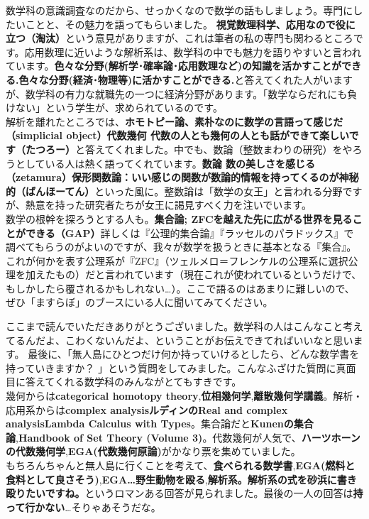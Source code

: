 数学科の意識調査なのだから、せっかくなので数学の話もしましょう。専門にしたいことと、その魅力を語ってもらいました。
{\bf 視覚数理科学、応用なので役に立つ（淘汰）}という意見がありますが、これは筆者の私の専門も関わるところです。応用数理に近いような解析系は、数学科の中でも魅力を語りやすいと言われています。{\bf 色々な分野(解析学･確率論･応用数理など)の知識を活かすことができる.色々な分野(経済･物理等)に活かすことができる.}と答えてくれた人がいますが、数学科の有力な就職先の一つに経済分野があります。「数学ならだれにも負けない」という学生が、求められているのです。\\
解析を離れたところでは、{\bf ホモトピー論、素朴なのに数学の言語って感じだ（simplicial object）}{\bf 代数幾何 代数の人とも幾何の人とも話ができて楽しいです（たつろー）}と答えてくれました。中でも、数論（整数まわりの研究）をやろうとしている人は熱く語ってくれています。{\bf 数論 数の美しさを感じる（zetamura）}{\bf 保形関数論：いい感じの関数が数論的情報を持ってくるのが神秘的（ばんほーてん）}といった風に。整数論は「数学の女王」と言われる分野ですが、熱意を持った研究者たちが女王に謁見すべく力を注いでいます。\\
数学の根幹を探ろうとする人も。{\bf 集合論; ZFCを越えた先に広がる世界を見ることができる（GAP）}詳しくは『公理的集合論』『ラッセルのパラドックス』で調べてもらうのがよいのですが、我々が数学を扱うときに基本となる『集合』。これが何かを表す公理系が『ZFC』（ツェルメロ＝フレンケルの公理系に選択公理を加えたもの）だと言われています（現在これが使われているというだけで、もしかしたら覆されるかもしれない…）。ここで語るのはあまりに難しいので、ぜひ「ますらぼ」のブースにいる人に聞いてみてください。

ここまで読んでいただきありがとうございました。数学科の人はこんなこと考えてるんだよ、こわくないんだよ、ということがお伝えできてればいいなと思います。
最後に、「無人島にひとつだけ何か持っていけるとしたら、どんな数学書を持っていきますか？ 」という質問をしてみました。こんなふざけた質問に真面目に答えてくれる数学科のみんながとてもすきです。\\
幾何からは{\bf categorical homotopy theory},{\bf 位相幾何学},{\bf 離散幾何学講義}。解析・応用系からは{\bf complex analysis}{\bf ルディンのReal and complex analysis}{\bf Lambda Calculus with Types}。集合論だと{\bf Kunenの集合論},{\bf Handbook of Set Theory (Volume 3)}。代数幾何が人気で、{\bf ハーツホーンの代数幾何学},{\bf EGA(代数幾何原論)}がかなり票を集めていました。\\
もちろんちゃんと無人島に行くことを考えて、{\bf 食べられる数学書},{\bf EGA(燃料と食料として良さそう)},{\bf EGA…野生動物を殴る},{\bf 解析系。解析系の式を砂浜に書き殴りたいですね。}というロマンある回答が見られました。最後の一人の回答は{\bf 持って行かない}…そりゃあそうだな。